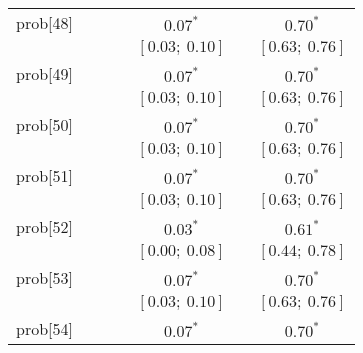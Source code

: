 \begin{table}
\begin{center}
\begin{tabular}{l c c c c c c }
prob[48]  &                           &                           &                           & $0.07^{*}$              &                           & $0.70^{*}$            \\
          &                           &                           &                           & $[0.03;\ 0.10]$         &                           & $[0.63;\ 0.76]$       \\
prob[49]  &                           &                           &                           & $0.07^{*}$              &                           & $0.70^{*}$            \\
          &                           &                           &                           & $[0.03;\ 0.10]$         &                           & $[0.63;\ 0.76]$       \\
prob[50]  &                           &                           &                           & $0.07^{*}$              &                           & $0.70^{*}$            \\
          &                           &                           &                           & $[0.03;\ 0.10]$         &                           & $[0.63;\ 0.76]$       \\
prob[51]  &                           &                           &                           & $0.07^{*}$              &                           & $0.70^{*}$            \\
          &                           &                           &                           & $[0.03;\ 0.10]$         &                           & $[0.63;\ 0.76]$       \\
prob[52]  &                           &                           &                           & $0.03^{*}$              &                           & $0.61^{*}$            \\
          &                           &                           &                           & $[0.00;\ 0.08]$         &                           & $[0.44;\ 0.78]$       \\
prob[53]  &                           &                           &                           & $0.07^{*}$              &                           & $0.70^{*}$            \\
          &                           &                           &                           & $[0.03;\ 0.10]$         &                           & $[0.63;\ 0.76]$       \\
prob[54]  &                           &                           &                           & $0.07^{*}$              &                           & $0.70^{*}$            \\

\end{tabular}
\end{center}
\end{table}
